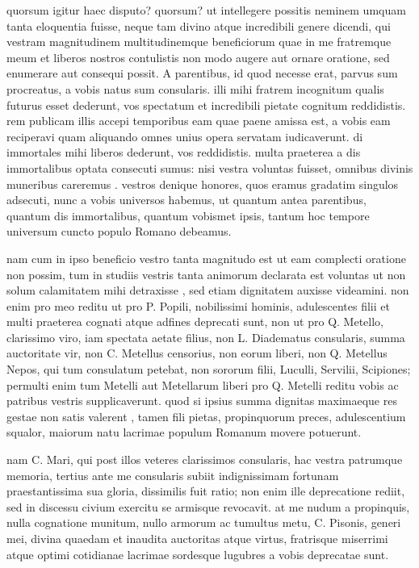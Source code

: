  quorsum igitur haec disputo? quorsum? ut intellegere possitis neminem umquam tanta eloquentia fuisse, neque tam divino atque incredibili genere dicendi, qui vestram magnitudinem multitudinemque beneficiorum quae in me fratremque meum et liberos nostros contulistis non modo augere aut ornare oratione, sed enumerare aut consequi possit. A parentibus, id quod necesse erat, parvus sum procreatus, a vobis natus sum consularis. illi mihi fratrem incognitum qualis futurus esset dederunt, vos spectatum et incredibili pietate cognitum reddidistis. rem publicam illis accepi temporibus eam quae paene amissa est, a vobis eam reciperavi quam aliquando omnes unius opera servatam iudicaverunt. di immortales mihi liberos dederunt, vos reddidistis. multa praeterea a dis immortalibus optata consecuti sumus: nisi vestra voluntas fuisset, omnibus divinis muneribus careremus . vestros denique honores, quos eramus gradatim singulos adsecuti, nunc a vobis universos habemus, ut quantum antea parentibus, quantum dis immortalibus, quantum vobismet ipsis, tantum hoc tempore universum cuncto populo Romano debeamus.

 nam cum in ipso beneficio vestro tanta magnitudo est ut eam complecti oratione non possim, tum in studiis vestris tanta animorum declarata est voluntas ut non solum calamitatem mihi detraxisse , sed etiam dignitatem auxisse videamini. non enim pro meo reditu ut pro P. Popili, nobilissimi hominis, adulescentes filii et multi praeterea cognati atque adfines deprecati sunt, non ut pro Q. Metello, clarissimo viro, iam spectata aetate filius, non L. Diadematus consularis, summa auctoritate vir, non C. Metellus censorius, non eorum liberi, non Q. Metellus Nepos, qui tum consulatum petebat, non sororum filii, Luculli, Servilii, Scipiones; permulti enim tum Metelli aut Metellarum liberi pro Q. Metelli reditu vobis ac patribus vestris supplicaverunt. quod si ipsius summa dignitas maximaeque res gestae non satis valerent , tamen fili pietas, propinquorum preces, adulescentium squalor, maiorum natu lacrimae populum Romanum movere potuerunt.

 nam C. Mari, qui post illos veteres clarissimos consularis, hac vestra patrumque memoria, tertius ante me consularis subiit indignissimam fortunam praestantissima sua gloria, dissimilis fuit ratio; non enim ille deprecatione rediit, sed in discessu civium exercitu se armisque revocavit. at me nudum a propinquis, nulla cognatione munitum, nullo armorum ac tumultus metu, C. Pisonis, generi mei, divina quaedam et inaudita auctoritas atque virtus, fratrisque miserrimi atque optimi cotidianae lacrimae sordesque lugubres a vobis deprecatae sunt.

